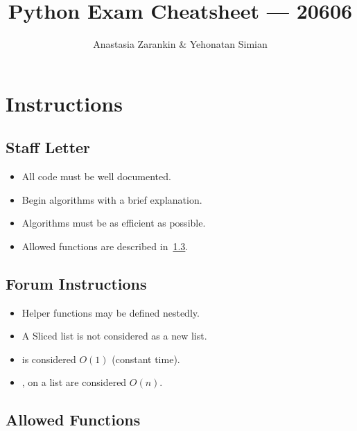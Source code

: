 \documentclass[11pt]{article}
\title{Python Exam Cheatsheet --- 20606}
\author{Anastasia Zarankin \& Yehonatan Simian}
\date{}
\begin{document}
\maketitle
\thispagestyle{empty} %

\section{Instructions}
\begin{multicols}{2}
\subsection{Staff Letter}
\begin{itemize}
  \item All code must be well documented.
  \item Begin algorithms with a brief explanation.
  \item Algorithms must be as efficient as possible.
  \item Allowed functions are described in~\cref{sec:allowed-functions}.
\end{itemize}

\subsection{Forum Instructions}
\begin{itemize}
  \item Helper functions may be defined nestedly.
  \item A Sliced list is not considered as a new list.
  \item {} is considered $O(1)$ (constant time).
  \item {},  on a list are considered $O(n)$.
\end{itemize}
\end{multicols}

\subsection{Allowed Functions}\label{sec:allowed-functions}
\end{document}
